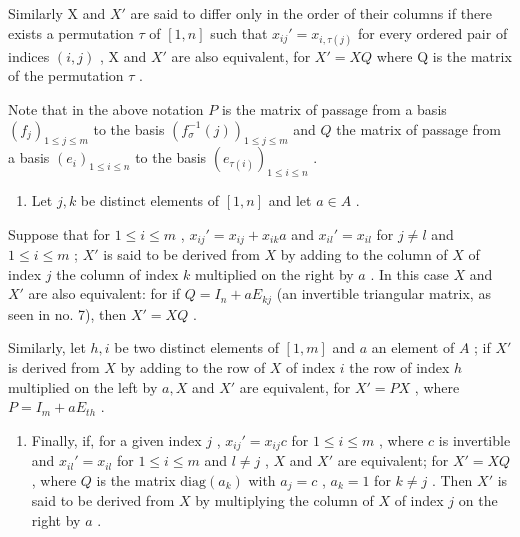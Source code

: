 Similarly X and \(X'\) are said to differ only in the order of their columns if there exists a permutation \(\tau\) of \([1, n]\) such that \(x_{ij}' = x_{i,\tau(j)}\) for every ordered pair of indices \((i,j)\) , X and \(X'\) are also equivalent, for \(X' = XQ\) where Q is the matrix of the permutation \(\tau\) .

Note that in the above notation \(P\) is the matrix of passage from a basis \((f_j)_{1 \leqslant j \leqslant m}\) to the basis \((f_\sigma^{-1}(j))_{1 \leqslant j \leqslant m}\) and \(Q\) the matrix of passage from a basis \((e_i)_{1 \leqslant i \leqslant n}\) to the basis \((e_{\tau(i)})_{1 \leqslant i \leqslant n}\) .

\begin{enumerate}
\def\labelenumi{(\arabic{enumi})}
\setcounter{enumi}{1}
\tightlist
\item
  Let \(j, k\) be distinct elements of \([1, n]\) and let \(a \in A\) .
\end{enumerate}

Suppose that for \(1 \leqslant i \leqslant m\) , \(x_{ij}' = x_{ij} + x_{ik}a\) and \(x_{il}' = x_{il}\) for \(j \neq l\) and \(1 \leqslant i \leqslant m\) ; \(X'\) is said to be derived from \(X\) by adding to the column of \(X\) of index \(j\) the column of index \(k\) multiplied on the right by \(a\) . In this case \(X\) and \(X'\) are also equivalent: for if \(Q = I_n + aE_{kj}\) (an invertible triangular matrix, as seen in no. 7), then \(X' = XQ\) .

Similarly, let \(h, i\) be two distinct elements of \([1, m]\) and \(a\) an element of \(A\) ; if \(X'\) is derived from \(X\) by adding to the row of \(X\) of index \(i\) the row of index \(h\) multiplied on the left by \(a, X\) and \(X'\) are equivalent, for \(X' = PX\) , where \(P = I_m + aE_{th}\) .

\begin{enumerate}
\def\labelenumi{(\arabic{enumi})}
\setcounter{enumi}{2}
\tightlist
\item
  Finally, if, for a given index \(j\) , \(x_{ij}' = x_{ij}c\) for \(1 \leqslant i \leqslant m\) , where \(c\) is invertible and \(x_{il}' = x_{il}\) for \(1 \leqslant i \leqslant m\) and \(l \neq j\) , \(X\) and \(X'\) are equivalent; for \(X' = XQ\) , where \(Q\) is the matrix \(\text{diag}(a_k)\) with \(a_j = c\) , \(a_k = 1\) for \(k \neq j\) . Then \(X'\) is said to be derived from \(X\) by multiplying the column of \(X\) of index \(j\) on the right by \(a\) .
\end{enumerate}

